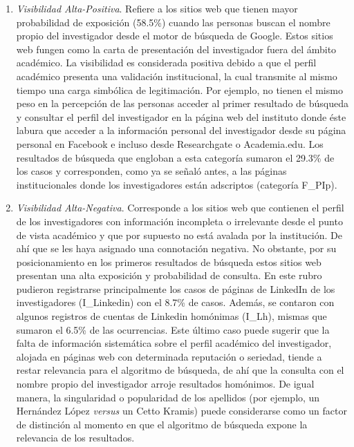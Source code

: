 \documentclass[
]{interact}
\providecommand{\tightlist}{%
  \setlength{\itemsep}{0pt}\setlength{\parskip}{0pt}}
\begin{document}
\begin{enumerate}
\def\labelenumi{\arabic{enumi}.}
\tightlist
\item
  \emph{Visibilidad Alta-Positiva}. Refiere a los sitios web que tienen
  mayor probabilidad de exposición (58.5\%) cuando las personas buscan
  el nombre propio del investigador desde el motor de búsqueda de
  Google. Estos sitios web fungen como la carta de presentación del
  investigador fuera del ámbito académico. La visibilidad es considerada
  positiva debido a que el perfil académico presenta una validación
  institucional, la cual transmite al mismo tiempo una carga simbólica
  de legitimación. Por ejemplo, no tienen el mismo peso en la percepción
  de las personas acceder al primer resultado de búsqueda y consultar el
  perfil del investigador en la página web del instituto donde éste
  labura que acceder a la información personal del investigador desde su
  página personal en Facebook e incluso desde Researchgate o
  Academia.edu. Los resultados de búsqueda que engloban a esta categoría
  sumaron el 29.3\% de los casos y corresponden, como ya se señaló
  antes, a las páginas institucionales donde los investigadores están
  adscriptos (categoría F\_PIp).
\item
  \emph{Visibilidad Alta-Negativa}. Corresponde a los sitios web que
  contienen el perfil de los investigadores con información incompleta o
  irrelevante desde el punto de vista académico y que por supuesto no
  está avalada por la institución. De ahí que se les haya asignado una
  connotación negativa. No obstante, por su posicionamiento en los
  primeros resultados de búsqueda estos sitios web presentan una alta
  exposición y probabilidad de consulta. En este rubro pudieron
  registrarse principalmente los casos de páginas de LinkedIn de los
  investigadores (I\_Linkedin) con el 8.7\% de casos. Además, se
  contaron con algunos registros de cuentas de Linkedin homónimas
  (I\_Lh), mismas que sumaron el 6.5\% de las ocurrencias. Este último
  caso puede sugerir que la falta de información sistemática sobre el
  perfil académico del investigador, alojada en páginas web con
  determinada reputación o seriedad, tiende a restar relevancia para el
  algoritmo de búsqueda, de ahí que la consulta con el nombre propio del
  investigador arroje resultados homónimos. De igual manera, la
  singularidad o popularidad de los apellidos (por ejemplo, un Hernández
  López \emph{versus} un Cetto Kramis) puede considerarse como un factor
  de distinción al momento en que el algoritmo de búsqueda expone la
  relevancia de los resultados.

\end{enumerate}
\end{document}
